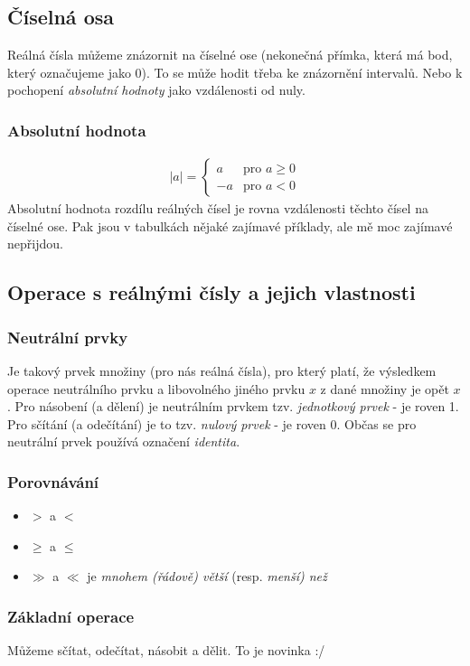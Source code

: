\documentclass[12pt]{article}
\providecommand{\abs}[1]{\lvert#1\rvert}
\begin{document}
\subsection{Číselná osa}
Reálná čísla můžeme znázornit na číselné ose (nekonečná přímka, která má bod, který označujeme jako 0). To se může hodit třeba ke znázornění intervalů. Nebo k pochopení \emph{absolutní hodnoty} jako vzdálenosti od nuly.
\subsubsection{Absolutní hodnota}
\begin{align}
 \abs{a} = \left\{\begin{array}{lr}
       a & \text{pro } a \geq 0\\
       -a  & \text{pro } a < 0
        \end{array} \right. 
\end{align}
Absolutní hodnota rozdílu reálných čísel je rovna vzdálenosti těchto čísel na číselné ose. Pak jsou v tabulkách nějaké zajímavé příklady, ale mě moc zajímavé nepřijdou.
\subsection{Operace s reálnými čísly a jejich vlastnosti}
\subsubsection{Neutrální prvky}
Je takový prvek množiny (pro nás reálná čísla), pro který platí, že výsledkem operace neutrálního prvku a libovolného jiného prvku $x$ z dané množiny je opět $x$. Pro násobení (a dělení) je neutrálním prvkem tzv. \emph{jednotkový prvek} - je roven 1. Pro sčítání (a odečítání) je to tzv. \emph{nulový prvek} -  je roven 0. Občas se pro neutrální prvek používá označení \emph{identita}.
\subsubsection{Porovnávání}
\begin{itemize}
\item $>$ a $<$
\item $\geq$ a $\leq$
\item $\gg$ a $\ll$ je \emph{mnohem (řádově) větší} (resp. \emph{menší) než} 
\end{itemize}
\subsubsection{Základní operace}
Můžeme sčítat, odečítat, násobit a dělit. To je novinka :/
\end{document}
